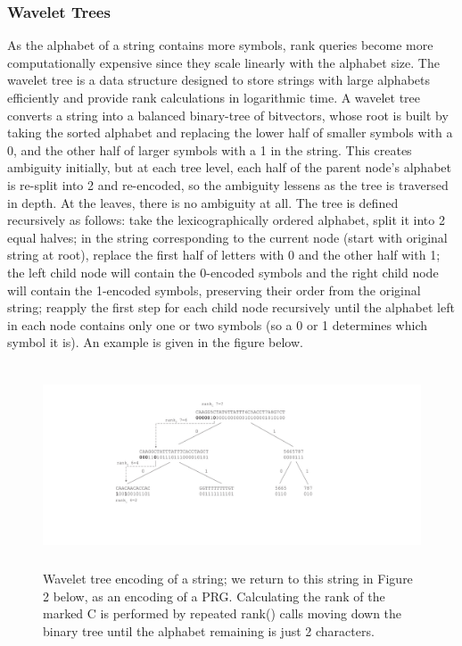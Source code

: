 \documentclass[runningheads,a4paper]{llncs}
\begin{document}
\subsubsection{Wavelet Trees}
As the alphabet of a string contains more symbols, rank queries become more computationally expensive since they scale linearly with the alphabet size. The wavelet tree is a data structure designed to store strings with large alphabets efficiently and provide rank calculations in logarithmic time. A wavelet tree converts a string into a balanced binary-tree of bitvectors, whose root is built by taking the sorted alphabet and replacing the lower half of smaller symbols with a 0, and the other half of larger symbols with a 1 in the string. This creates ambiguity initially, but at each tree level, each half of the parent node's alphabet is re-split into 2 and re-encoded, so the ambiguity lessens as the tree is traversed in depth. At the leaves, there is no ambiguity at all. The tree is defined recursively as follows: take the lexicographically ordered alphabet, split it into 2 equal halves; in the string corresponding to the current node (start with original string at root), replace the first half of letters with 0 and the other half with 1; the left child node will contain the 0-encoded symbols and the right child node will contain the 1-encoded symbols, preserving their order from the original string; reapply the first step for each child node recursively until the alphabet left in each node contains only one or two symbols (so a 0 or 1 determines which symbol it is). An example is given in the figure below.

 \begin{figure}
\centering
\includegraphics[height=6cm]{wavelet_tree.pdf}
\caption{Wavelet tree encoding of a string; we return to this string in Figure 2 below, as an encoding of a PRG. Calculating the rank of the marked C is performed by repeated rank() calls moving down the binary tree until the alphabet remaining is just 2 characters.}
\label{fig:wt}
\end{figure}
\end{document}
